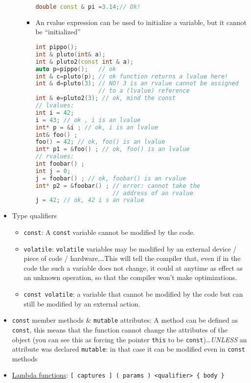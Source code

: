 \documentclass[a4paper,12pt,%
              final%
              ]{article}
\begin{document}
\begin{itemize}
\begin{itemize}
\begin{itemize}
\begin{lstlisting}[language=C++]
double const & pi =3.14;// Ok!
            \end{lstlisting}
          \item An rvalue expression can be used to initialize a variable, but it cannot be “initialized”
            \begin{lstlisting}[language=C++]
int pippo();
int & pluto(int& a);
int & pluto2(const int & a);
auto p=pippo();   // ok
int & c=pluto(p); // ok function returns a lvalue here!
int & d=pluto(3); // NO! 3 is an rvalue cannot be assigned
                  // to a (lvalue) reference
int & e=pluto2(3); // ok, mind the const
// lvalues:
int i = 42;
i = 43; // ok , i is an lvalue
int* p = &i ; // ok, i is an lvalue
int& foo() ;
foo() = 42; // ok, foo() is an lvalue
int* p1 = &foo() ; // ok, foo() is an lvalue
// rvalues:
int foobar() ;
int j = 0;
j = foobar() ; // ok, foobar() is an rvalue
int* p2 = &foobar() ; // error: cannot take the
                      // address of an rvalue
j = 42; // ok, 42 i s an rvalue
            \end{lstlisting}
        \end{itemize}
    \end{itemize}
  \item Type qualifiers
    \begin{itemize}
      \item \texttt{const}: A \texttt{const} variable cannot be modified by the code.
      \item \texttt{volatile}: \texttt{volatile} variables may be modified by an external device / piece of code / hardware,\ldots This will tell the compiler that, even if in the code the such a variable does not change, it could at anytime as effect as an unknown operation, so that the compiler won't make optimizations.
      \item \texttt{const volatile}: a variable that cannot be modified by the code but can still be modified by an external action.
    \end{itemize}
  \item \texttt{const} member methods \& \texttt{mutable} attributes: A method can be defined as \texttt{const}, this means that the function cannot change the attributes of the object (you can see this as forcing the pointer \texttt{this} to be \texttt{const})\ldots \emph{UNLESS} an attribute was declared \texttt{mutable}: in that case it can be modified even in \texttt{const} methods
  \item \href{https://en.cppreference.com/w/cpp/language/lambda}{Lambda functions}: \verb|[ captures ] ( params ) <qualifier> { body }|

\end{itemize}
\end{document}
